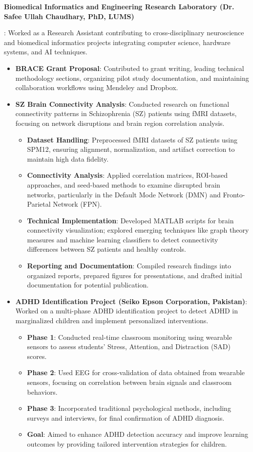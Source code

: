 \documentclass[letterpaper,10pt]{article}
\newcommand{\resumeItem}[2]{
  \item\small{
    \textbf{#1}{: #2 \vspace{-2pt}}
  }
}
\newcommand{\resumeSubItem}[2]{\resumeItem{#1}{#2}\vspace{-4pt}}
\begin{document}
\resumeSubItem{Biomedical Informatics and Engineering Research Laboratory (Dr. Safee Ullah Chaudhary, PhD, LUMS)}
{Worked as a Research Assistant contributing to cross-disciplinary neuroscience and biomedical informatics projects integrating computer science, hardware systems, and AI techniques.
\begin{itemize}
    \item \textbf{BRACE Grant Proposal}: Contributed to grant writing, leading technical methodology sections, organizing pilot study documentation, and maintaining collaboration workflows using Mendeley and Dropbox.
    \item \textbf{SZ Brain Connectivity Analysis}: Conducted research on functional connectivity patterns in Schizophrenia (SZ) patients using fMRI datasets, focusing on network disruptions and brain region correlation analysis.
    \begin{itemize}
        \item \textbf{Dataset Handling}: Preprocessed fMRI datasets of SZ patients using SPM12, ensuring alignment, normalization, and artifact correction to maintain high data fidelity.
        \item \textbf{Connectivity Analysis}: Applied correlation matrices, ROI-based approaches, and seed-based methods to examine disrupted brain networks, particularly in the Default Mode Network (DMN) and Fronto-Parietal Network (FPN).
        \item \textbf{Technical Implementation}: Developed MATLAB scripts for brain connectivity visualization; explored emerging techniques like graph theory measures and machine learning classifiers to detect connectivity differences between SZ patients and healthy controls.
        \item \textbf{Reporting and Documentation}: Compiled research findings into organized reports, prepared figures for presentations, and drafted initial documentation for potential publication.
    \end{itemize}
    \item \textbf{ADHD Identification Project (Seiko Epson Corporation, Pakistan)}: Worked on a multi-phase ADHD identification project to detect ADHD in marginalized children and implement personalized interventions.
    \begin{itemize}
        \item \textbf{Phase 1}: Conducted real-time classroom monitoring using wearable sensors to assess students' Stress, Attention, and Distraction (SAD) scores.
        \item \textbf{Phase 2}: Used EEG for cross-validation of data obtained from wearable sensors, focusing on correlation between brain signals and classroom behaviors.
        \item \textbf{Phase 3}: Incorporated traditional psychological methods, including surveys and interviews, for final confirmation of ADHD diagnosis.
        \item \textbf{Goal}: Aimed to enhance ADHD detection accuracy and improve learning outcomes by providing tailored intervention strategies for children.
    \end{itemize}
\end{itemize}
}
\end{document}
